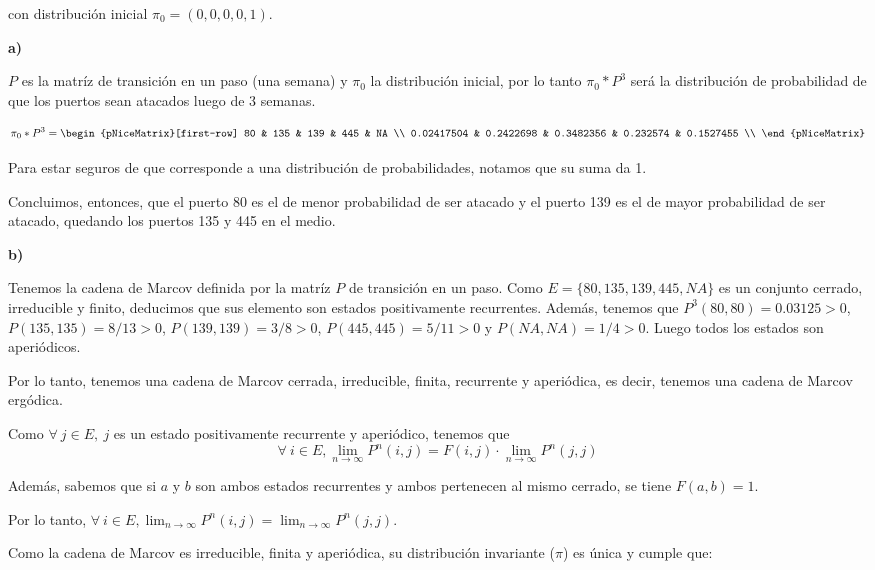 \documentclass[11pt]{article}
\begin{document}
con distribución inicial $\pi_0 = (0,0,0,0,1)$.

\textbf{a)}

$P$ es la matríz de transición en un paso (una semana) y $\pi_0$ la distribución inicial, por lo tanto $\pi_0 * P^3$ será la distribución de probabilidad de que los puertos sean atacados luego de 3 semanas.

\begin{equation}
    \pi_0 * P^3 = \begin{pNiceMatrix}[first-row]
        80         & 135       & 139       & 445      & NA        \\
        0.02417504 & 0.2422698 & 0.3482356 & 0.232574 & 0.1527455 \\
    \end{pNiceMatrix}
\end{equation}

Para estar seguros de que corresponde a una distribución de probabilidades, notamos que su suma da 1.

Concluimos, entonces, que el puerto 80 es el de menor probabilidad de ser atacado y el puerto 139 es el de mayor probabilidad de ser atacado, quedando los puertos 135 y 445 en el medio.

\textbf{b)}

Tenemos la cadena de Marcov definida por la matríz $P$ de transición en un paso. Como $E = \{80, 135, 139, 445, NA\}$ es un conjunto cerrado, irreducible y finito, deducimos que sus elemento son estados positivamente recurrentes. 
Además, tenemos que $P^3(80,80) = 0.03125 > 0$, $P(135,135) = 8/13 > 0$, $P(139,139) = 3/8 > 0$, $P(445,445) = 5/11 > 0$ y $P(NA,NA) = 1/4 > 0$. Luego todos los estados son aperiódicos.

Por lo tanto, tenemos una cadena de Marcov cerrada, irreducible, finita, recurrente y aperiódica, es decir, tenemos una cadena de Marcov ergódica.

Como $\forall\ j \in E,\ j$ es un estado positivamente recurrente y aperiódico, tenemos que 
$$\forall\ i \in E, \lim_{n \to \infty} P^n(i,j) = F(i,j) \cdot \lim_{n \to \infty} P^n(j,j)$$

Además, sabemos que si $a$ y $b$ son ambos estados recurrentes y ambos pertenecen al mismo cerrado, se tiene $F(a,b)=1$.

Por lo tanto, $\forall\ i \in E, \lim_{n \to \infty} P^n(i,j) = \lim_{n \to \infty} P^n(j,j)$.

Como la cadena de Marcov es irreducible, finita y aperiódica, su distribución invariante ($\pi$) es única y cumple que:
\end{document}
